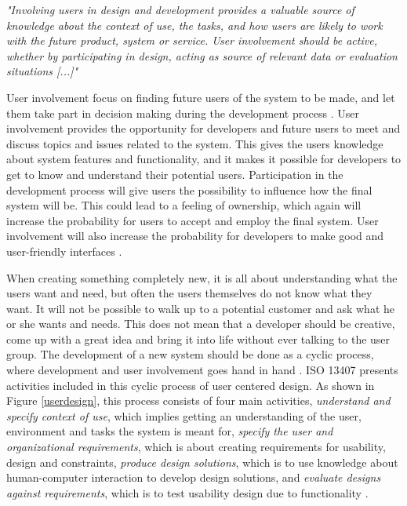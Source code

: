\emph{"Involving users in design and development provides a valuable source of knowledge about the context of use, the tasks, and how users are likely to work with the future product, system or service. User involvement should be active, whether by participating in design, acting as source of relevant data or evaluation situations [...]"}

User involvement focus on finding future users of the system to be made, and let them take part in decision making during the development process \cite{bjerknes1995user}. User involvement provides the opportunity for developers and future users to meet and discuss topics and issues related to the system. This gives the users knowledge about system features and functionality, and it makes it possible for developers to get to know and understand their potential users. Participation in the development process will give users the possibility to influence how the final system will be. This could lead to a feeling of ownership, which again will increase the probability for users to accept and employ the final system. User involvement will also increase the probability for developers to make good and user-friendly interfaces \cite{infodesign} \cite{mmi}. 

When creating something completely new, it is all about understanding what the users want and need, but often the users themselves do not know what they want. It will not be possible to walk up to a potential customer and ask what he or she wants and needs. This does not mean that a developer should be creative, come up with a great idea and bring it into life without ever talking to the user group. The development of a new system should be done as a cyclic process, where development and user involvement goes hand in hand \cite{mmi}. ISO 13407 presents activities included in this cyclic process of user centered design. As shown in Figure \ref{userdesign}, this process consists of four main activities, \emph{understand and specify context of use}, which implies getting an understanding of the user, environment and tasks the system is meant for, \emph{specify the user and organizational requirements}, which is about creating requirements for usability, design and constraints, \emph{produce design solutions}, which is to use knowledge about human-computer interaction to develop design solutions, and \emph{evaluate designs against requirements}, which is to test usability design due to functionality \cite{jokela2003standard}.

